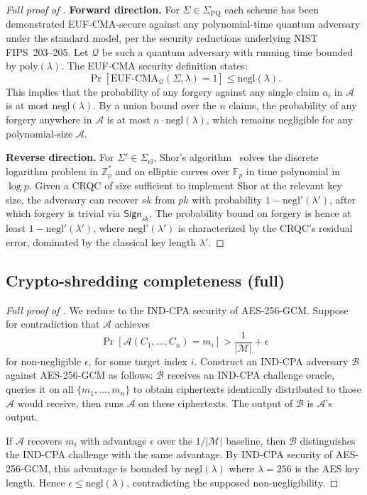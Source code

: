 \documentclass[11pt,a4paper,parskip=half-,DIV=12,headings=standardclasses]{scrartcl}
\theoremstyle{ncthm}
\theoremstyle{ncdef}
\newcommand{\accretion}{\mathcal{A}}
\newcommand{\pqset}{\Sigma_{\mathrm{PQ}}}
\newcommand{\Negl}{\mathrm{negl}}
\newcommand{\Sign}{\mathsf{Sign}}
\begin{document}
\begin{proof}[Full proof of ]
\textbf{Forward direction.} For $\Sigma \in \pqset$ each scheme has
been demonstrated EUF-CMA-secure against any polynomial-time quantum
adversary under the standard model, per the security reductions
underlying NIST FIPS~203--205. Let $\mathcal{Q}$ be such a quantum
adversary with running time bounded by $\mathrm{poly}(\lambda)$. The
EUF-CMA security definition states:
\[
\Pr[\mathrm{EUF\text{-}CMA}_{\mathcal{Q}}(\Sigma, \lambda) = 1] \leq \Negl(\lambda).
\]
This implies that the probability of any forgery against any single
claim $a_i$ in $\accretion$ is at most $\Negl(\lambda)$. By a union
bound over the $n$ claims, the probability of any forgery anywhere
in $\accretion$ is at most $n \cdot \Negl(\lambda)$, which remains
negligible for any polynomial-size $\accretion$.

\textbf{Reverse direction.} For $\Sigma' \in \Sigma_{\mathrm{cl}}$,
Shor's algorithm~\cite{shor-1994} solves the discrete logarithm
problem in $\mathbb{Z}_p^*$ and on elliptic curves over $\mathbb{F}_p$
in time polynomial in $\log p$. Given a CRQC of size sufficient to
implement Shor at the relevant key size, the adversary can recover
$sk$ from $pk$ with probability $1 - \Negl'(\lambda')$, after which
forgery is trivial via $\Sign_{sk}$. The probability bound on forgery
is hence at least $1 - \Negl'(\lambda')$, where $\Negl'(\lambda')$ is
characterized by the CRQC's residual error, dominated by the
classical key length $\lambda'$.

\end{proof}

\subsection{Crypto-shredding completeness (full)}

\begin{proof}[Full proof of ]
We reduce to the IND-CPA security of AES-256-GCM. Suppose for
contradiction that $\mathcal{A}$ achieves
\[
\Pr[\mathcal{A}(C_1, \ldots, C_n) = m_i] > \frac{1}{|\mathcal{M}|} + \epsilon
\]
for non-negligible $\epsilon$, for some target index $i$. Construct
an IND-CPA adversary $\mathcal{B}$ against AES-256-GCM as follows:
$\mathcal{B}$ receives an IND-CPA challenge oracle, queries it on
all $\{m_1, \ldots, m_n\}$ to obtain ciphertexts identically
distributed to those $\mathcal{A}$ would receive, then runs
$\mathcal{A}$ on these ciphertexts. The output of $\mathcal{B}$ is
$\mathcal{A}$'s output.

If $\mathcal{A}$ recovers $m_i$ with advantage $\epsilon$ over the
$1/|\mathcal{M}|$ baseline, then $\mathcal{B}$ distinguishes the
IND-CPA challenge with the same advantage. By IND-CPA security of
AES-256-GCM, this advantage is bounded by $\Negl(\lambda)$ where
$\lambda = 256$ is the AES key length. Hence $\epsilon \leq
\Negl(\lambda)$, contradicting the supposed non-negligibility.
\end{proof}
\end{document}
